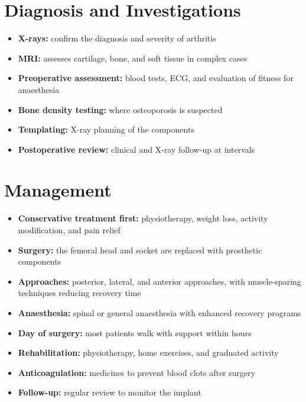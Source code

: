 \section*{Diagnosis and Investigations}
\begin{itemize}
    \item \textbf{X-rays:} confirm the diagnosis and severity of arthritis
    \item \textbf{MRI:} assesses cartilage, bone, and soft tissue in complex cases
    \item \textbf{Preoperative assessment:} blood tests, ECG, and evaluation of fitness for anaesthesia
    \item \textbf{Bone density testing:} where osteoporosis is suspected
    \item \textbf{Templating:} X-ray planning of the components
    \item \textbf{Postoperative review:} clinical and X-ray follow-up at intervals
\end{itemize}

\section*{Management}
\begin{itemize}
    \item \textbf{Conservative treatment first:} physiotherapy, weight loss, activity modification, and pain relief
    \item \textbf{Surgery:} the femoral head and socket are replaced with prosthetic components
    \item \textbf{Approaches:} posterior, lateral, and anterior approaches, with muscle-sparing techniques reducing recovery time
    \item \textbf{Anaesthesia:} spinal or general anaesthesia with enhanced recovery programs
    \item \textbf{Day of surgery:} most patients walk with support within hours
    \item \textbf{Rehabilitation:} physiotherapy, home exercises, and graduated activity
    \item \textbf{Anticoagulation:} medicines to prevent blood clots after surgery
    \item \textbf{Follow-up:} regular review to monitor the implant
\end{itemize}

